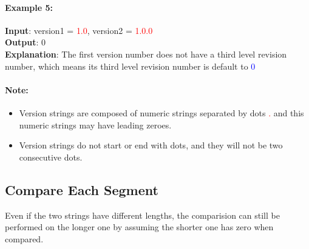 \paragraph{Example 5:}
\begin{flushleft}
\textbf{Input}: version1 = \textcolor{red}{1.0}, version2 = \textcolor{red}{1.0.0}
\\
\textbf{Output}: 0
\\
\textbf{Explanation}: The first version number does not have a third level revision number, which means its third level revision number is default to \textcolor{blue}{0}
\end{flushleft}
\paragraph{Note:}
\begin{itemize}
    \item Version strings are composed of numeric strings separated by dots \textcolor{red}{.} and this numeric strings may have leading zeroes.
    \item Version strings do not start or end with dots, and they will not be two consecutive dots.
\end{itemize}
\subsection{Compare Each Segment}
Even if the two strings have different lengths, the comparision can still be performed on the longer one by assuming the shorter one has zero when compared.